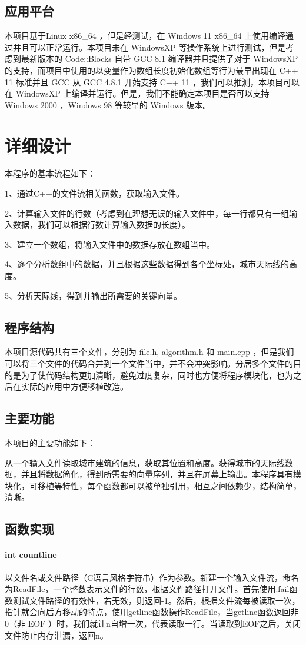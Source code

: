 \documentclass[a4paper]{ctexart}
\begin{document}
	\subsection{应用平台}
	本项目基于Linux x86\_64 ，但是经测试，在 Windows 11 x86\_64 上使用编译通过并且可以正常运行。本项目未在 WindowsXP 等操作系统上进行测试，但是考虑到最新版本的 Code::Blocks 自带 GCC 8.1 编译器并且提供了对于 WindowsXP 的支持，而项目中使用的以变量作为数组长度初始化数组等行为最早出现在 C++ 11 标准并且 GCC 从 GCC 4.8.1 开始支持 C++ 11 ，我们可以推测，本项目可以在 WindowsXP 上编译并运行。但是，我们不能确定本项目是否可以支持 Windows 2000 ，Windows 98 等较早的 Windows 版本。
	\section{详细设计}
	本程序的基本流程如下：

	1、通过C++的文件流相关函数，获取输入文件。

	2、计算输入文件的行数（考虑到在理想无误的输入文件中，每一行都只有一组输入数据，我们可以根据行数计算输入数据的长度）。

	3、建立一个数组，将输入文件中的数据存放在数组当中。

	4、逐个分析数组中的数据，并且根据这些数据得到各个坐标处，城市天际线的高度。

	5、分析天际线，得到并输出所需要的关键向量。
	\subsection{程序结构}
	本项目源代码共有三个文件，分别为 file.h, algorithm.h 和 main.cpp ，但是我们可以将三个文件的代码合并到一个文件当中，并不会冲突影响。分居多个文件的目的是为了使代码结构更加清晰，避免过度复杂，同时也方便将程序模块化，也为之后在实际的应用中方便移植改造。
	\subsection{主要功能}
	本项目的主要功能如下：
	
	从一个输入文件读取城市建筑的信息，获取其位置和高度。获得城市的天际线数据，并且将数据简化，得到所需要的向量序列，并且在屏幕上输出。本程序具有模块化，可移植等特性，每个函数都可以被单独引用，相互之间依赖少，结构简单，清晰。
	\subsection{函数实现}
	\paragraph{int countline}
	以文件名或文件路径（C语言风格字符串）作为参数。新建一个输入文件流，命名为ReadFile，一个整数表示文件的行数，根据文件路径打开文件。首先使用.fail函数测试文件路径的有效性，若无效，则返回-1。然后，根据文件流每被读取一次，指针就会向后方移动的特点，使用getline函数操作ReadFile，当getline函数返回非0（非 EOF ）时，我们就让n自增一次，代表读取一行。当读取到EOF之后，关闭文件防止内存泄漏，返回n。
\end{document}
